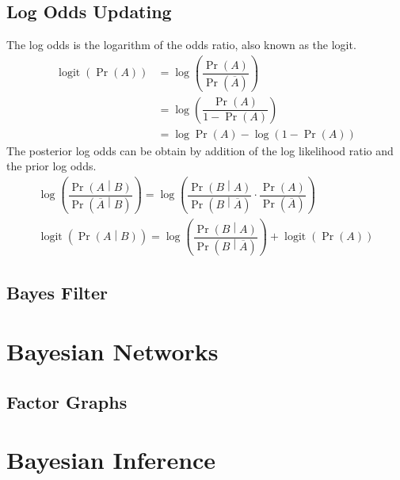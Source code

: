 \documentclass[11pt]{report} %
\begin{document}
\subsection{Log Odds Updating}

The log odds is the logarithm of the odds ratio, also known as the logit.
\begin{align}
\operatorname{logit}\left(\operatorname{Pr}\left(A\right)\right) &= \log\left(\dfrac{\operatorname{Pr}\left(A\right)}{\operatorname{Pr}\left(\overline{A}\right)}\right) \\
&= \log\left(\dfrac{\operatorname{Pr}\left(A\right)}{1 - \operatorname{Pr}\left(A\right)}\right) \\
&= \log\operatorname{Pr}\left(A\right) - \log\left(1 - \operatorname{Pr}\left(A\right)\right)
\end{align}
The posterior log odds can be obtain by addition of the log likelihood ratio and the prior log odds.
\begin{gather}
\log\left(\dfrac{\operatorname{Pr}\left(A\middle|B\right)}{\operatorname{Pr}\left(\overline{A}\middle|B\right)}\right) = \log\left(\dfrac{\operatorname{Pr}\left(B\middle|A\right)}{\operatorname{Pr}\left(B\middle|\overline{A}\right)}\cdot\dfrac{\operatorname{Pr}\left(A\right)}{\operatorname{Pr}\left(\overline{A}\right)}\right) \\
\operatorname{logit}\left(\operatorname{Pr}\left(A\middle|B\right)\right) = \log\left(\dfrac{\operatorname{Pr}\left(B\middle|A\right)}{\operatorname{Pr}\left(B\middle|\overline{A}\right)}\right) + \operatorname{logit}\left(\operatorname{Pr}\left(A\right)\right)
\end{gather}

\subsection{Bayes Filter}

\section{Bayesian Networks}

\subsection{Factor Graphs}

\section{Bayesian Inference}
\end{document}
